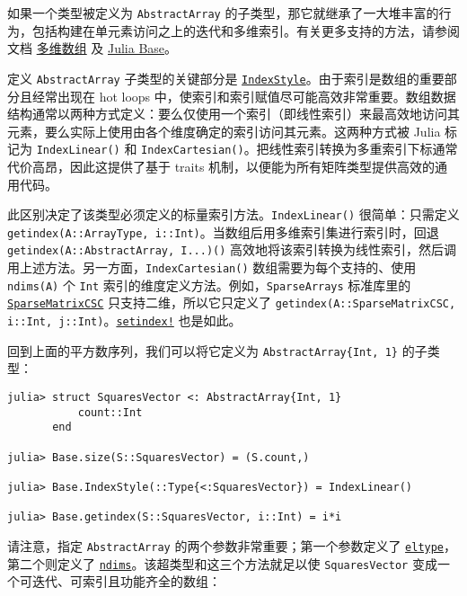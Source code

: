如果一个类型被定义为 \texttt{AbstractArray} 的子类型，那它就继承了一大堆丰富的行为，包括构建在单元素访问之上的迭代和多维索引。有关更多支持的方法，请参阅文档 \hyperlink{16720099245556932994}{多维数组} 及 \hyperlink{3951748617092839742}{Julia Base}。



定义 \texttt{AbstractArray} 子类型的关键部分是 \hyperlink{7782790551324367092}{\texttt{IndexStyle}}。由于索引是数组的重要部分且经常出现在 hot loops 中，使索引和索引赋值尽可能高效非常重要。数组数据结构通常以两种方式定义：要么仅使用一个索引（即线性索引）来最高效地访问其元素，要么实际上使用由各个维度确定的索引访问其元素。这两种方式被 Julia 标记为 \texttt{IndexLinear()} 和 \texttt{IndexCartesian()}。把线性索引转换为多重索引下标通常代价高昂，因此这提供了基于 traits 机制，以便能为所有矩阵类型提供高效的通用代码。



此区别决定了该类型必须定义的标量索引方法。\texttt{IndexLinear()} 很简单：只需定义 \texttt{getindex(A::ArrayType, i::Int)}。当数组后用多维索引集进行索引时，回退 \texttt{getindex(A::AbstractArray, I...)()} 高效地将该索引转换为线性索引，然后调用上述方法。另一方面，\texttt{IndexCartesian()} 数组需要为每个支持的、使用 \texttt{ndims(A)} 个 \texttt{Int} 索引的维度定义方法。例如，\texttt{SparseArrays} 标准库里的 \hyperlink{15099699527958384292}{\texttt{SparseMatrixCSC}} 只支持二维，所以它只定义了 \texttt{getindex(A::SparseMatrixCSC, i::Int, j::Int)}。\hyperlink{1309244355901386657}{\texttt{setindex!}} 也是如此。



回到上面的平方数序列，我们可以将它定义为 \texttt{AbstractArray\{Int, 1\}} 的子类型：




\begin{verbatim}
julia> struct SquaresVector <: AbstractArray{Int, 1}
           count::Int
       end

julia> Base.size(S::SquaresVector) = (S.count,)

julia> Base.IndexStyle(::Type{<:SquaresVector}) = IndexLinear()

julia> Base.getindex(S::SquaresVector, i::Int) = i*i
\end{verbatim}



请注意，指定 \texttt{AbstractArray} 的两个参数非常重要；第一个参数定义了 \hyperlink{6396209842929672718}{\texttt{eltype}}，第二个则定义了 \hyperlink{1688406579181746010}{\texttt{ndims}}。该超类型和这三个方法就足以使 \texttt{SquaresVector} 变成一个可迭代、可索引且功能齐全的数组：




